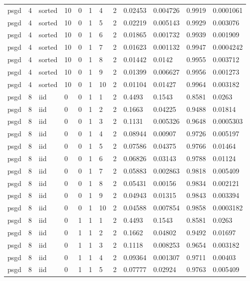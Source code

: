 \begin{tabular}{llllllllllll}
psgd & 4 & sorted & 10 & 0 & 1 & 4 & 2 & 0.02453 & 0.004726 & 0.9919 & 0.0001061 \\
psgd & 4 & sorted & 10 & 0 & 1 & 5 & 2 & 0.02219 & 0.005143 & 0.9929 & 0.003076 \\
psgd & 4 & sorted & 10 & 0 & 1 & 6 & 2 & 0.01865 & 0.001732 & 0.9939 & 0.001909 \\
psgd & 4 & sorted & 10 & 0 & 1 & 7 & 2 & 0.01623 & 0.001132 & 0.9947 & 0.0004242 \\
psgd & 4 & sorted & 10 & 0 & 1 & 8 & 2 & 0.01442 & 0.0142 & 0.9955 & 0.003712 \\
psgd & 4 & sorted & 10 & 0 & 1 & 9 & 2 & 0.01399 & 0.006627 & 0.9956 & 0.001273 \\
psgd & 4 & sorted & 10 & 0 & 1 & 10 & 2 & 0.01104 & 0.01427 & 0.9964 & 0.003182 \\
psgd & 8 & iid & 0 & 0 & 1 & 1 & 2 & 0.4493 & 0.1543 & 0.8581 & 0.0263 \\
psgd & 8 & iid & 0 & 0 & 1 & 2 & 2 & 0.1663 & 0.04225 & 0.9488 & 0.01814 \\
psgd & 8 & iid & 0 & 0 & 1 & 3 & 2 & 0.1131 & 0.005326 & 0.9648 & 0.0005303 \\
psgd & 8 & iid & 0 & 0 & 1 & 4 & 2 & 0.08944 & 0.00907 & 0.9726 & 0.005197 \\
psgd & 8 & iid & 0 & 0 & 1 & 5 & 2 & 0.07586 & 0.04375 & 0.9766 & 0.01464 \\
psgd & 8 & iid & 0 & 0 & 1 & 6 & 2 & 0.06826 & 0.03143 & 0.9788 & 0.01124 \\
psgd & 8 & iid & 0 & 0 & 1 & 7 & 2 & 0.05883 & 0.002863 & 0.9818 & 0.005409 \\
psgd & 8 & iid & 0 & 0 & 1 & 8 & 2 & 0.05431 & 0.00156 & 0.9834 & 0.002121 \\
psgd & 8 & iid & 0 & 0 & 1 & 9 & 2 & 0.04943 & 0.01315 & 0.9843 & 0.003394 \\
psgd & 8 & iid & 0 & 0 & 1 & 10 & 2 & 0.04588 & 0.007854 & 0.9858 & 0.0003182 \\
psgd & 8 & iid & 0 & 1 & 1 & 1 & 2 & 0.4493 & 0.1543 & 0.8581 & 0.0263 \\
psgd & 8 & iid & 0 & 1 & 1 & 2 & 2 & 0.1662 & 0.04802 & 0.9492 & 0.01697 \\
psgd & 8 & iid & 0 & 1 & 1 & 3 & 2 & 0.1118 & 0.008253 & 0.9654 & 0.003182 \\
psgd & 8 & iid & 0 & 1 & 1 & 4 & 2 & 0.09364 & 0.001307 & 0.9711 & 0.00403 \\
psgd & 8 & iid & 0 & 1 & 1 & 5 & 2 & 0.07777 & 0.02924 & 0.9763 & 0.005409 \\

\end{tabular}
